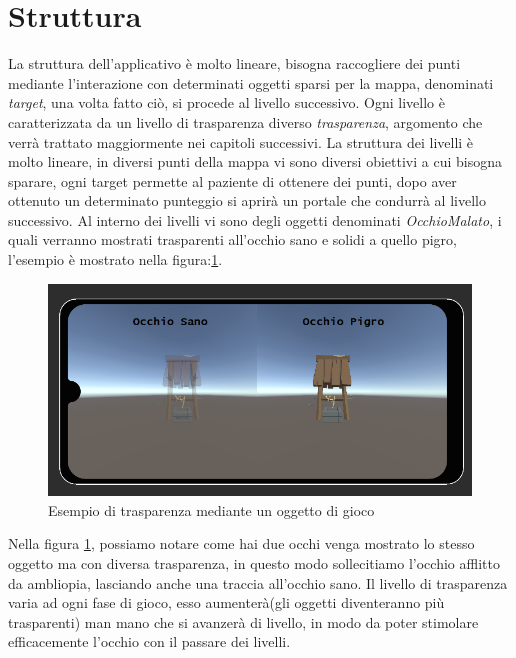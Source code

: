 \documentclass[
a4paper,
cleardoublepage=empty,
headings=twolinechapter,
numbers=autoenddot,
]{scrbook}
\begin{document}
    \section{Struttura}
    La struttura dell'applicativo è molto lineare, bisogna raccogliere dei punti mediante l'interazione con determinati oggetti sparsi per la mappa, denominati \textit{target}, una volta fatto ciò, si procede al livello successivo.
    Ogni livello è caratterizzata da un livello di trasparenza diverso \textit{trasparenza}, argomento che verrà trattato maggiormente nei capitoli successivi.
    La struttura dei livelli è molto lineare, in diversi punti della mappa vi sono diversi obiettivi a cui bisogna sparare, ogni target permette al paziente di ottenere dei punti, dopo aver ottenuto un determinato punteggio si aprirà un portale che condurrà al livello successivo.
    Al interno dei livelli vi sono degli oggetti denominati \textit{OcchioMalato}, i quali verranno mostrati trasparenti all'occhio sano e solidi a quello pigro, l'esempio è mostrato nella figura:\ref{fig:pozzo}.
    \begin{figure}[H]
    	\centering
    	\includegraphics[width=0.8\linewidth]{image/Pr_trasparenza}
    	\caption{Esempio di trasparenza mediante un oggetto di gioco}
    	\label{fig:pozzo}
    \end{figure}
    Nella figura \ref{fig:pozzo}, possiamo notare come hai due occhi venga mostrato lo stesso oggetto ma con diversa trasparenza, in questo modo sollecitiamo l'occhio afflitto da ambliopia, lasciando anche una traccia all'occhio sano.
    Il livello di trasparenza varia ad ogni fase di gioco, esso aumenterà(gli oggetti diventeranno più trasparenti) man mano che si avanzerà di livello, in modo da poter stimolare efficacemente l'occhio con il passare dei livelli.
\end{document}
